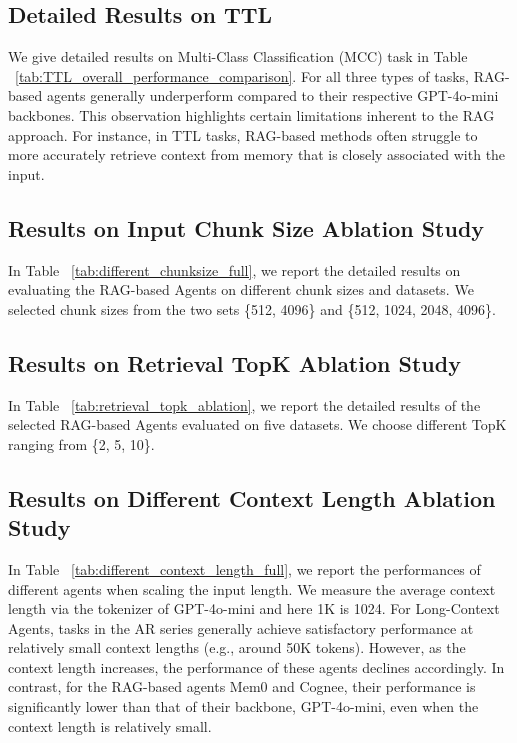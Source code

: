 \subsection{Detailed Results on TTL}

We give detailed results on Multi-Class Classification (MCC) task in Table ~\ref{tab:TTL_overall_performance_comparison}. For all three types of tasks, RAG-based agents generally underperform compared to their respective GPT-4o-mini backbones. This observation highlights certain limitations inherent to the RAG approach. For instance, in TTL tasks, RAG-based methods often struggle to more accurately retrieve context from memory that is closely associated with the input. 


\subsection{Results on Input Chunk Size Ablation Study}
\label{sub:input_chunk_ablation}

In Table ~\ref{tab:different_chunksize_full}, we report the detailed results on evaluating the RAG-based Agents on different chunk sizes and datasets. We selected chunk sizes from the two sets \{512, 4096\} and \{512, 1024, 2048, 4096\}. 

\subsection{Results on Retrieval TopK Ablation Study}
\label{sub:results_on_topk}

In Table ~\ref{tab:retrieval_topk_ablation}, we report the detailed results of the selected RAG-based Agents evaluated on five datasets. We choose different TopK ranging from \{2, 5, 10\}. 


\subsection{Results on Different Context Length Ablation Study}
\label{sub:different_context_length}


In Table ~\ref{tab:different_context_length_full}, we report the performances of different agents when scaling the input length. We measure the average context length via the tokenizer of GPT-4o-mini and here 1K is 1024. For Long-Context Agents, tasks in the AR series generally achieve satisfactory performance at relatively small context lengths (e.g., around 50K tokens). However, as the context length increases, the performance of these agents declines accordingly. In contrast, for the RAG-based agents Mem0 and Cognee, their performance is significantly lower than that of their backbone, GPT-4o-mini, even when the context length is relatively small.


